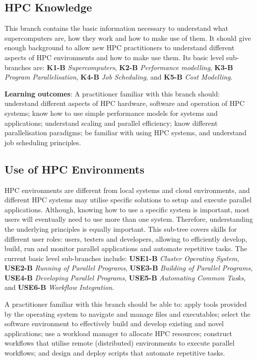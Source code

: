 \documentclass[jocse]{jocseart}
\begin{document}
\subsection{HPC Knowledge}

This branch contains the basic information necessary to understand what supercomputers are, how they work and how to make use of them. It should give enough background to allow new HPC practitioners to understand different aspects of HPC environments and how to make use them. Its basic level sub-branches are: \textbf{K1-B} \textit{Supercomputers}, \textbf{K2-B} \textit{Performance modelling}, \textbf{K3-B} \textit{Program Parallelisation}, \textbf{K4-B} \textit{Job Scheduling}, and \textbf{K5-B} \textit{Cost Modelling}.

\textbf{Learning outcomes}: A practitioner familiar with this branch should: understand different aspects of HPC hardware, software and operation of HPC systems; know how to use simple performance models for systems and applications; understand scaling and parallel efficiency; know different parallelisation paradigms; be familiar with using HPC systems, and understand job scheduling principles.

\subsection{Use of HPC Environments}

HPC environments are different from local systems and cloud environments, and different HPC systems may utilise  specific solutions to setup and execute parallel applications. Although, knowing how to use a specific system is important, most users will eventually need to use more than one system. Therefore, understanding the underlying principles is equally important. This sub-tree covers skills for different user roles: users, testers and developers, allowing to efficiently develop, build, run and monitor parallel applications and automate repetitive tasks. The current basic level sub-branches include: \textbf{USE1-B} \textit{Cluster Operating System}, \textbf{USE2-B} \textit{Running of Parallel Programs}, \textbf{USE3-B} \textit{Building of Parallel Programs}, \textbf{USE4-B} \textit{Developing Parallel Programs}, \textbf{USE5-B} \textit{Automating Common Tasks}, and \textbf{USE6-B} \textit{Workflow Integration}.

A practitioner familiar with this branch should be able to: apply tools provided by the operating system to navigate and manage files and executables; select the software environment to effectively build and develop existing and novel applications; use a workload manager to allocate HPC resources; construct workflows that utilise remote (distributed) environments to execute parallel workflows; and design and deploy scripts that automate repetitive tasks.
\end{document}

